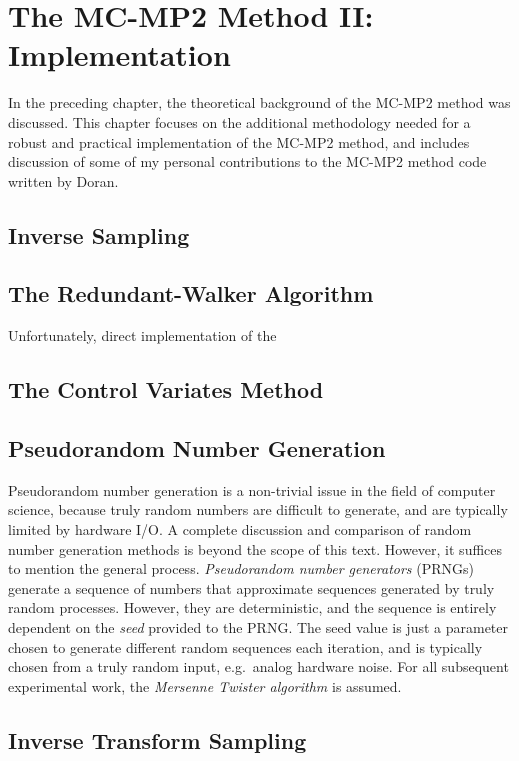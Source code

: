 \chapter{The MC-MP2 Method II: Implementation}

In the preceding chapter, the theoretical background of the MC-MP2 method was
discussed. This chapter focuses on the additional methodology needed for a
robust and practical implementation of the MC-MP2 method, and includes
discussion of some of my personal contributions to the MC-MP2 method code
written by Doran.

\section{Inverse Sampling}

\section{The Redundant-Walker Algorithm}

Unfortunately, direct implementation of the

\section{The Control Variates Method}

\section{Pseudorandom Number Generation}

Pseudorandom number generation is a non-trivial issue in the field of computer
science, because truly random numbers are difficult to generate, and are
typically limited by hardware I/O. A complete discussion and comparison of
random number generation methods is beyond the scope of this text. However, it
suffices to mention the general process. \emph{Pseudorandom number generators}
(PRNGs) generate a sequence of numbers that approximate sequences generated by
truly random processes. However, they are deterministic, and the sequence is
entirely dependent on the \emph{seed} provided to the PRNG. The seed value is
just a parameter chosen to generate different random sequences each iteration,
and is typically chosen from a truly random input, e.g.\ analog hardware noise.
For all subsequent experimental work, the \emph{Mersenne Twister algorithm} is
assumed.

\section{Inverse Transform Sampling}
